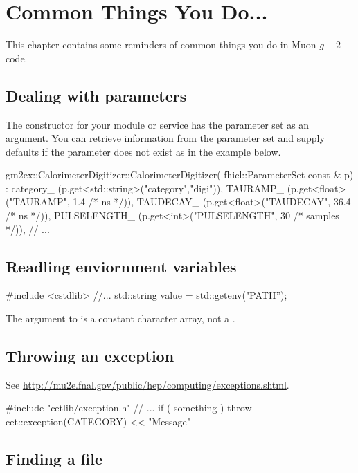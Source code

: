 \chapter{Common Things You Do...}

This chapter contains some reminders of common things you do in Muon $g-2$ code. 

\section{Dealing with parameters}
\label{sec-dealing-params}
The constructor for your module or service has the parameter set as an argument. You can retrieve information from the parameter set and supply defaults if the parameter does not exist as in the example below.

\begin{cpplisting}
gm2ex::CalorimeterDigitizer::CalorimeterDigitizer(
            fhicl::ParameterSet const & p) :
  category_    (p.get<std::string>("category","digi")),
  TAURAMP_     (p.get<float>("TAURAMP", 1.4 /* ns */)),
  TAUDECAY_    (p.get<float>("TAUDECAY", 36.4 /* ns */)),
  PULSELENGTH_ (p.get<int>("PULSELENGTH", 30 /* samples */)),
// ...
\end{cpplisting}

\section{Readling enviornment variables}

\begin{cpplisting}
 #include <cstdlib>
//...
std::string value = std::getenv("PATH'');
\end{cpplisting}

The argument to  is a constant character array, not a . \\

\section{Throwing an exception}

See \url{http://mu2e.fnal.gov/public/hep/computing/exceptions.shtml}. 

\begin{cpplisting}
#include "cetlib/exception.h"
// ...
if ( something ) {
  throw cet::exception(CATEGORY) << "Message\n"
}
\end{cpplisting}

\section{Finding a file}

